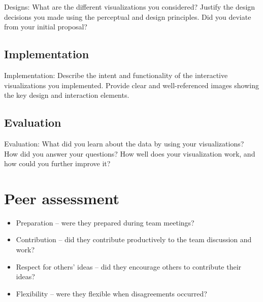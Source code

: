 \documentclass[a4paper,10pt]{article}
\begin{document}
Designs: What are the different visualizations you considered? Justify the design decisions you made using the perceptual and design principles.
Did you deviate from your initial proposal?

\subsection{Implementation}

Implementation: Describe the intent and functionality of the interactive visualizations you implemented. Provide clear and well-referenced images showing the key design and interaction elements.

\subsection{Evaluation}

Evaluation: What did you learn about the data by using your visualizations? How did you answer your questions? How well does your visualization work, and how could you further improve it?

\section{Peer assessment}

\begin{itemize}
  \item Preparation – were they prepared during team meetings?
  \item Contribution – did they contribute productively to the team discussion and work?
  \item Respect for others’ ideas – did they encourage others to contribute their ideas?
  \item Flexibility – were they flexible when disagreements occurred?
\end{itemize}
\end{document}
